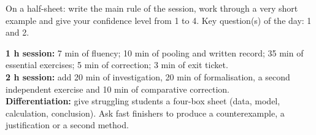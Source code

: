 \begin{exitticket}[3 minutes]On a half-sheet: write the main rule of the session, work through a very short example and give your confidence level from 1 to 4. Key question(s) of the day: 1 and 2.\end{exitticket}

\ifmxteacher
\begin{method}
\textbf{1 h session:} 7 min of fluency; 10 min of pooling and written record; 35 min of essential exercises; 5 min of correction; 3 min of exit ticket.\\
\textbf{2 h session:} add 20 min of investigation, 20 min of formalisation, a second independent exercise and 10 min of comparative correction.\\
\textbf{Differentiation:} give struggling students a four-box sheet (data, model, calculation, conclusion). Ask fast finishers to produce a counterexample, a justification or a second method.
\end{method}
\fi
